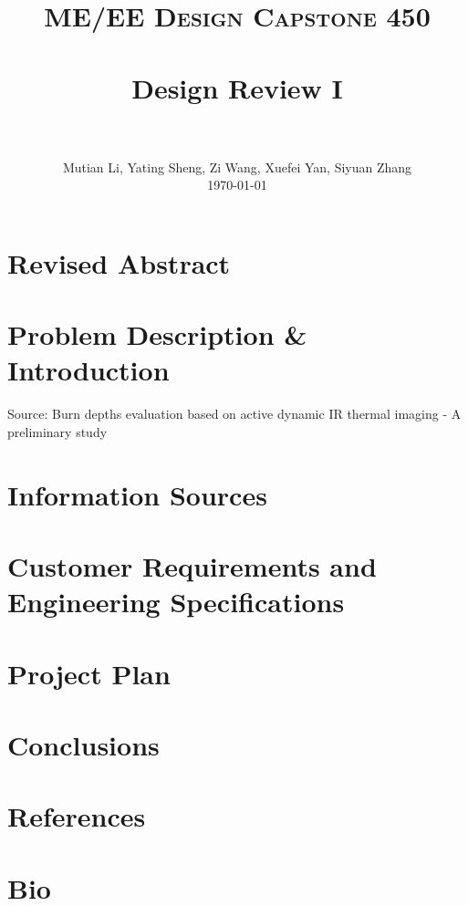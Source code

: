 \documentclass[paper=letter, fontsize=11pt]{scrartcl}
\title{
		\vspace{-1in} 	
		\usefont{OT1}{bch}{b}{n}
		\normalfont \normalsize \textsc{ME/EE Design Capstone 450} \\ [25pt]
		\horrule{0.5pt} \\[0.4cm]
		\huge Design Review I \\
		\horrule{2pt} \\[0.5cm]
}
\author{
        \normalfont 							
        \normalsize
        Mutian Li, Yating Sheng, Zi Wang, Xuefei Yan, Siyuan Zhang\\[3pt]
        \today
}
\date{}
\numberwithin{equation}{section}		%
\numberwithin{figure}{section}			%
\numberwithin{table}{section}			%
\begin{document}
\maketitle
\section*{Revised Abstract}


\section*{Problem Description \& Introduction}

Source: 
Burn depths evaluation based on active dynamic IR thermal imaging - A preliminary study 

\section*{Information Sources}

\section*{Customer Requirements and Engineering Specifications}

\section*{Project Plan}

\section*{Conclusions}

\section*{References}

\section*{Bio}
\end{document}
